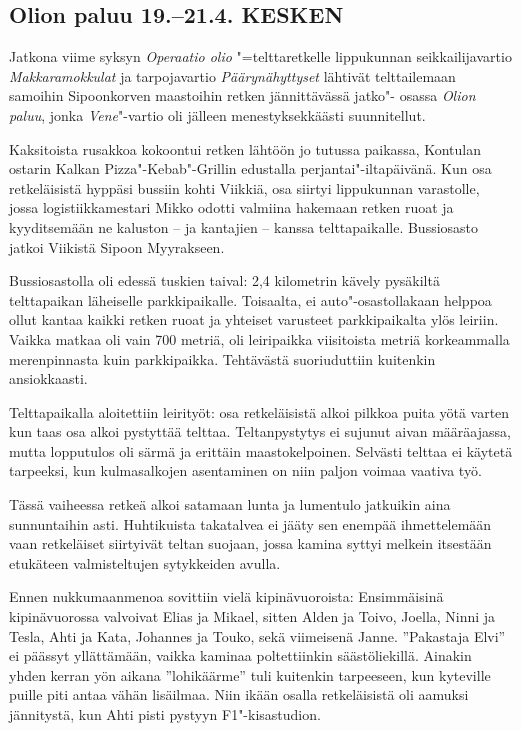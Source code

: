 
\clearpage
\subsection{Olion paluu 19.--21.4. KESKEN}

\begin{multicols}{2}

	\noindent Jatkona viime syksyn \textit{Operaatio olio} "=telttaretkelle lippukunnan
	seikkailijavartio \textit{Makkaramokkulat} ja tarpojavartio \textit{Päärynähyttyset} lähtivät
	telttailemaan samoihin Sipoonkorven maastoihin retken jännittävässä jatko"-
	osassa \textit{Olion paluu}, jonka \textit{Vene}"-vartio oli jälleen menestyksekkäästi
	suunnitellut.

	Kaksitoista rusakkoa kokoontui retken lähtöön jo tutussa paikassa, Kontulan
	ostarin Kalkan Pizza"-Kebab"-Grillin edustalla perjantai"-iltapäivänä. Kun osa
	retkeläisistä hyppäsi bussiin kohti Viikkiä, osa siirtyi lippukunnan
	varastolle, jossa logistiikkamestari Mikko odotti valmiina hakemaan retken
	ruoat ja kyyditsemään ne kaluston -- ja kantajien -- kanssa telttapaikalle.
	Bussiosasto jatkoi Viikistä Sipoon Myyrakseen.

	Bussiosastolla oli edessä tuskien taival: 2,4 kilometrin kävely pysäkiltä
	telttapaikan läheiselle parkkipaikalle. Toisaalta, ei auto"-osastollakaan
	helppoa ollut kantaa kaikki retken ruoat ja yhteiset varusteet parkkipaikalta
	ylös leiriin. Vaikka matkaa oli vain 700 metriä, oli leiripaikka viisitoista
	metriä korkeammalla merenpinnasta kuin parkkipaikka. Tehtävästä suoriuduttiin
	kuitenkin ansiokkaasti.

	Telttapaikalla aloitettiin leirityöt: osa retkeläisistä alkoi pilkkoa puita
	yötä varten kun taas osa alkoi pystyttää telttaa. Teltanpystytys ei sujunut
	aivan määräajassa, mutta lopputulos oli särmä ja erittäin maastokelpoinen.
	Selvästi telttaa ei käytetä tarpeeksi, kun kulmasalkojen asentaminen on niin
	paljon voimaa vaativa työ.

	Tässä vaiheessa retkeä alkoi satamaan lunta ja lumentulo jatkuikin aina
	sunnuntaihin asti. Huhtikuista takatalvea ei jääty sen enempää ihmettelemään
	vaan retkeläiset siirtyivät teltan suojaan, jossa kamina syttyi melkein
	itsestään etukäteen valmisteltujen sytykkeiden avulla.

	Ennen nukkumaanmenoa sovittiin vielä kipinävuoroista: Ensimmäisinä
	kipinävuorossa valvoivat Elias ja Mikael, sitten Alden ja Toivo, Joella, Ninni
	ja Tesla, Ahti ja Kata, Johannes ja Touko, sekä viimeisenä Janne. ''Pakastaja
	Elvi'' ei päässyt yllättämään, vaikka kaminaa poltettiinkin säästöliekillä.
	Ainakin yhden kerran yön aikana ''lohikäärme'' tuli kuitenkin tarpeeseen, kun
	kyteville puille piti antaa vähän lisäilmaa. Niin ikään osalla retkeläisistä
	oli aamuksi jännitystä, kun Ahti pisti pystyyn F1"-kisastudion.


\end{multicols}
